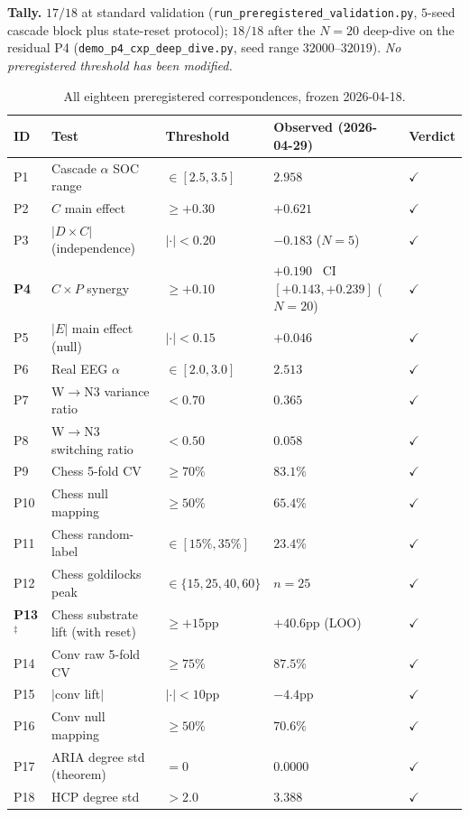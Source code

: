 \textbf{Tally.} $17/18$ at standard validation
(\texttt{run\_preregistered\_validation.py}, $5$-seed cascade block
plus state-reset protocol); $18/18$ after the $N\!=\!20$ deep-dive
on the residual P4 (\texttt{demo\_p4\_cxp\_deep\_dive.py}, seed range
$32000$--$32019$). \emph{No preregistered threshold has been modified.}

\begin{table}[ht]
\centering
\small
\caption{All eighteen preregistered correspondences, frozen 2026-04-18.}
\label{tab:eighteen_prereg}
\begin{tabular}{l l l l l}
\toprule
ID & Test & Threshold & Observed (2026-04-29) & Verdict \\
\midrule
P1  & Cascade $\alpha$ SOC range            & $\in [2.5, 3.5]$ & $2.958$ & $\checkmark$ \\
P2  & $C$ main effect                        & $\geq +0.30$     & $+0.621$ & $\checkmark$ \\
P3  & $|D{\times}C|$ (independence)          & $|\cdot| < 0.20$ & $-0.183$ ($N\!=\!5$) & $\checkmark$ \\
\textbf{P4} & $C{\times}P$ synergy           & $\geq +0.10$     &
   $+0.190$ \, CI $[+0.143, +0.239]$ ($N\!=\!20$) & $\checkmark$ \\
P5  & $|E|$ main effect (null)               & $|\cdot| < 0.15$ & $+0.046$ & $\checkmark$ \\
P6  & Real EEG $\alpha$                      & $\in [2.0, 3.0]$ & $2.513$ & $\checkmark$ \\
P7  & W$\!\to\!$N3 variance ratio            & $< 0.70$         & $0.365$ & $\checkmark$ \\
P8  & W$\!\to\!$N3 switching ratio           & $< 0.50$         & $0.058$ & $\checkmark$ \\
P9  & Chess 5-fold CV                        & $\geq 70\%$      & $83.1\%$ & $\checkmark$ \\
P10 & Chess null mapping                     & $\geq 50\%$      & $65.4\%$ & $\checkmark$ \\
P11 & Chess random-label                     & $\in [15\%, 35\%]$ & $23.4\%$ & $\checkmark$ \\
P12 & Chess goldilocks peak                  & $\in \{15, 25, 40, 60\}$ & $n=25$ & $\checkmark$ \\
\textbf{P13}$^{\ddagger}$ & Chess substrate lift (with reset) & $\geq +15$pp & $+40.6$pp (LOO) & $\checkmark$ \\
P14 & Conv raw 5-fold CV                     & $\geq 75\%$      & $87.5\%$ & $\checkmark$ \\
P15 & $|$conv lift$|$                        & $|\cdot| < 10$pp & $-4.4$pp & $\checkmark$ \\
P16 & Conv null mapping                      & $\geq 50\%$      & $70.6\%$ & $\checkmark$ \\
P17 & ARIA degree std (theorem)              & $= 0$            & $0.0000$ & $\checkmark$ \\
P18 & HCP degree std                         & $> 2.0$          & $3.388$ & $\checkmark$ \\
\bottomrule
\end{tabular}
\end{table}

